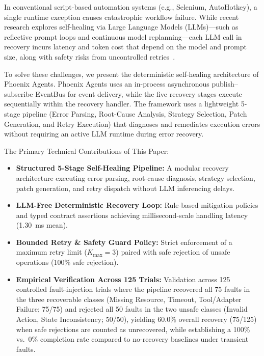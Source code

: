\documentclass[conference]{IEEEtran}
\newcommand{\chg}[1]{{\color{blue}#1}}
\begin{document}
In conventional script-based automation systems (e.g., Selenium, AutoHotkey), a single runtime exception causes catastrophic workflow failure. While recent research explores self-healing via Large Language Models (LLMs)---such as reflective prompt loops and continuous model replanning---\chg{each LLM call in recovery incurs latency and token cost that depend on the model and prompt size, along with safety risks from uncontrolled retries~\cite{babu2026,jeong2026}.}

To solve these challenges, we present the deterministic self-healing architecture of Phoenix Agents. Phoenix Agents uses an in-process asynchronous publish--subscribe EventBus for event delivery, while the five recovery stages execute sequentially within the recovery handler. The framework uses a lightweight 5-stage pipeline (Error Parsing, Root-Cause Analysis, Strategy Selection, Patch Generation, and Retry Execution) that diagnoses and remediates execution errors without requiring an active LLM runtime during error recovery.

The Primary Technical Contributions of This Paper:
\begin{itemize}
    \item \textbf{Structured 5-Stage Self-Healing Pipeline:} A modular recovery architecture executing error parsing, root-cause diagnosis, strategy selection, patch generation, and retry dispatch without LLM inferencing delays.
    \item \textbf{LLM-Free Deterministic Recovery Loop:} Rule-based mitigation policies and typed contract assertions achieving millisecond-scale handling latency (1.30~ms mean).
    \item \textbf{Bounded Retry \& Safety Guard Policy:} Strict enforcement of a maximum retry limit ($K_{\text{max}} = 3$) paired with safe rejection of unsafe operations (100\% safe rejection).
    \item \textbf{Empirical Verification Across 125 Trials:} \chg{Validation across 125 controlled fault-injection trials where the pipeline recovered all 75 faults in the three recoverable classes (Missing Resource, Timeout, Tool/Adapter Failure; 75/75) and rejected all 50 faults in the two unsafe classes (Invalid Action, State Inconsistency; 50/50), yielding 60.0\% overall recovery (75/125) when safe rejections are counted as unrecovered, while establishing a 100\% vs.\ 0\% completion rate compared to no-recovery baselines under transient faults.}
\end{itemize}
\end{document}
